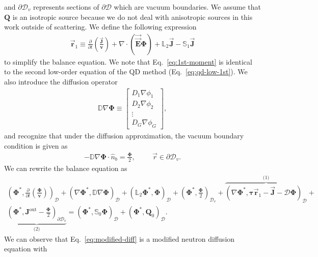 %
and $\partial\mathcal{D}_v$ represents sections of $\partial\mathcal{D}$ which are vacuum boundaries. We
assume that $\bm{Q}$ is an isotropic source because we do not deal with anisotropic sources in
this work outside of scattering.
We define the following expression
%
\begin{gather}
  \vec{\bm{r}}_1 \equiv \frac{\partial}{\partial t}\left(\frac{\vec{\bm{J}}}{\bm{v}}\right)
  + \nabla\cdot(\vec{\vec{\bm{E}}}\bm{\Phi}) + \mathbb{L}_2\vec{\bm{J}} -
  \mathbb{S}_1\vec{\bm{J}} \label{eq:1st-moment}
\end{gather}
%
to simplify the balance equation. We note that Eq.\ \ref{eq:1st-moment} is identical to the second
low-order equation of the \gls{QD} method (Eq.\ \ref{eq:qd-low-1st}).
We also introduce the diffusion operator
%
\begin{gather}
  \mathbb{D}\nabla\bm{\Phi} \equiv
  \begin{bmatrix}
    D_1\nabla\phi_1 \\
    D_2\nabla\phi_2 \\
    \vdots \\
    D_G\nabla\phi_G
  \end{bmatrix},
\end{gather}
%
and recognize that under the diffusion approximation, the vacuum boundary condition is given as
%
\begin{gather}
  -\mathbb{D}\nabla\bm{\Phi}\cdot\hat{n}_b = \frac{\bm{\Phi}}{2}, \hspace{1cm} \vec{r}\in\partial
  \mathcal{D}_v.
\end{gather}
%
We can rewrite the balance equation as
%
\begin{multline}
  \left(\bm{\Phi}^*,\frac{\partial}{\partial t}\left(\frac{\bm{\Phi}}{\bm{v}}\right)\right)_\mathcal{D}
  + \left(\nabla\bm{\Phi}^*, \mathbb{D}\nabla\bm{\Phi}\right)_\mathcal{D}
  + \left(\mathbb{L}_2\bm{\Phi}^*,\bm{\Phi}\right)_\mathcal{D}
  + \left(\bm{\Phi}^*,\frac{\bm{\Phi}}{2}\right)_{\mathcal{D}_v}
  + \overbrace{\left(\nabla\bm{\Phi}^*,\bm{\tau}\vec{\bm{r}}_1-\vec{\bm{J}}-\mathcal{D}\bm{\Phi}\right)_\mathcal{D}}^\text{(1)}
  + \\
  \underbrace{\left(\bm{\Phi}^*,\bm{J}^\text{out}-\frac{\bm{\Phi}}{2}\right)_{\partial\mathcal{D}_v}}_\text{(2)}
  = \left(\bm{\Phi}^*,\mathbb{S}_0\bm{\Phi}\right)_\mathcal{D}
  + \left(\bm{\Phi}^*,\bm{Q}_0\right)_\mathcal{D}. \label{eq:modified-diff}
\end{multline}
%
We can observe that Eq.\ \ref{eq:modified-diff} is a modified neutron diffusion equation with
